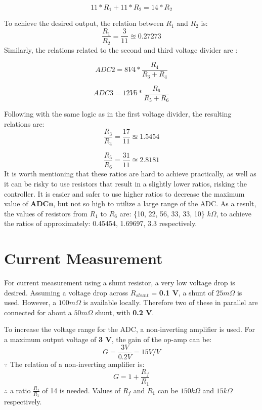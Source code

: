 \begin{equation}
	11*R_1 + 11*R_2 = 14*R_2
\end{equation}

To achieve the desired output, the relation between \textbf{$R_1$} and \textbf{$R_2$} is:
\begin{equation}
	\frac{R_1}{R_2} = \frac{3}{11} \approxeq 0.27273
\end{equation}
Similarly, the relations related to the second  and third voltage divider are : 

\begin{equation}
	ADC2 = 8V4*\frac{R_4}{R_3 + R_4}
\end{equation}

\begin{equation}
	ADC3 = 12V6*\frac{R_6}{R_5 + R_6}
\end{equation}

Following with the same logic as in the first voltage divider, the resulting relations are:
\begin{equation}
	\frac{R_3}{R_4} = \frac{17}{11} \approxeq 1.5454
\end{equation}

\begin{equation}
	\frac{R_5}{R_6} = \frac{31}{11} \approxeq 2.8181
\end{equation}
It is worth mentioning that these ratios are hard to achieve practically, as well as it can be risky to use resistors that result in a slightly lower ratios, risking the controller. It is easier and safer to use higher ratios to decrease the maximum value of \textbf{ADCn}, but not so high to utilize a large range of the ADC.
\newline As a result, the values of resistors from \textbf{$R_1$} to \textbf{$R_6$} are: \{10, 22, 56, 33, 33, 10\} $k\Omega$, to achieve the ratios of approximately: {0.45454, 1.69697, 3.3} respectively.

\section{Current Measurement}
For current measurement using a shunt resistor, a very low voltage drop is desired. Assuming a voltage drop across $R_{shunt}$ = \textbf{0.1 V}, a shunt of $25 m\Omega$ is used. However, a $100 m\Omega$ is available locally. Therefore two of these in parallel are connected for about a $50 m\Omega$ shunt, with \textbf{0.2 V}.

To increase the voltage range for the ADC, a non-inverting amplifier is used. For a maximum output voltage of \textbf{3 V}, the gain of the op-amp can be:
\begin{equation}
	G = \frac{3 V}{0.2 V} = 15 V/V
\end{equation}
$\because$ The relation of a non-inverting amplifier is:
\begin{equation}
	G = 1 + \frac{R_f}{R_1}
\end{equation}
$\therefore$ a ratio $\frac{R_f}{R_1}$ of 14 is needed. Values of $R_f$ and $R_1$ can be \textbf{$150k\Omega$} and \textbf{$15k\Omega$} respectively.

